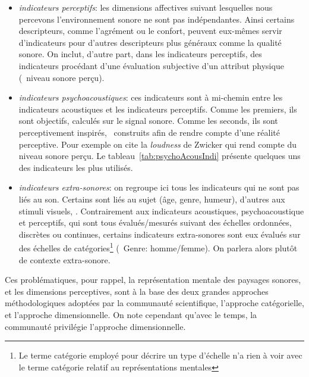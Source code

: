 \begin{itemize}
\begin{itemize}
\item \emph{indicateurs perceptifs}: les dimensions affectives suivant lesquelles nous percevons l'environnement sonore ne sont pas indépendantes. Ainsi certains descripteurs, comme l'agrément ou le confort, peuvent eux-mêmes servir d'indicateurs pour d'autres descripteurs plus généraux comme la qualité sonore. On inclut, d'autre part, dans les indicateurs perceptifs, des indicateurs procédant d'une évaluation subjective d'un attribut physique (\eg~niveau sonore perçu).

\item \emph{indicateurs psychoacoustiques}: ces indicateurs sont à mi-chemin entre les indicateurs acoustiques et les indicateurs perceptifs. Comme les premiers, ils sont objectifs, calculés sur le signal sonore. Comme les seconds, ils sont perceptivement inspirés, \ie~construits afin de rendre compte d'une réalité perceptive. Pour exemple on cite la \emph{loudness} de Zwicker \citep{zwicker2013psychoacoustics} qui rend compte du niveau sonore perçu. Le tableau~\ref{tab:psychoAcousIndi} présente quelques uns des indicateurs les plus utilisés.

\item \emph{indicateurs extra-sonores}: on regroupe ici tous les indicateurs qui ne sont pas liés au son. Certains sont liés au sujet (âge, genre, humeur), d'autres aux stimuli visuels, . Contrairement aux indicateurs acoustiques, psychoacoustique et perceptifs, qui sont tous évalués/mesurés suivant des échelles ordonnées, discrètes ou continues, certains indicateurs extra-sonores sont eux évalués sur des échelles de catégories\footnote{Le terme catégorie employé pour décrire un type d'échelle n'a rien à voir avec le terme catégorie relatif au représentations mentales} (\eg~Genre: homme/femme). On parlera alors plutôt de contexte extra-sonore.
\end{itemize}

\end{itemize}

Ces problématiques, pour rappel, la représentation mentale des paysages sonores, et les dimensions perceptives, sont à la base des deux grandes approches méthodologiques adoptées par la communauté scientifique, l'approche catégorielle, et l'approche dimensionnelle. On note cependant qu'avec le temps, la communauté privilégie l'approche dimensionnelle. \\


